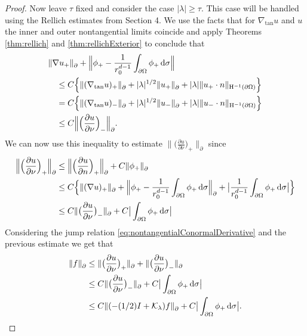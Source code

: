 \begin{proof}
  Now leave $\tau$ fixed and consider the case $|\lambda| \geq \tau$.
  This case will be handled using the Rellich estimates from Section 4.
  We use the facts that for $\nabla_{\mathrm{tan}} u$ and $u$ the inner and outer nontangential limits coincide and apply Theorems \ref{thm:rellich} and \ref{thm:rellichExterior} to conclude that
  \begin{align*}
    &\|\nabla u_+ \|^{}_\partial + \Big\| \phi_+ - \frac{1}{r_0^{d - 1}}\int_{\partial\Omega} \phi_+ \, {\operatorname{d}\!{\sigma}} \Big\| \\
    &\quad\leq C \Big\{ \|( \nabla_{\mathrm{tan}} u)_+ \|^{}_\partial + |\lambda|^{1/2} \|u_+\|^{}_\partial + |\lambda| \| u_+\cdot n\|_{\mathrm{H}^{-1}(\partial\Omega)} \Big\} \\
    &\quad = C \Big\{ \|( \nabla_{\mathrm{tan}} u)_- \|^{}_\partial + |\lambda|^{1/2} \|u_-\|^{}_\partial + |\lambda| \| u_-\cdot n\|_{\mathrm{H}^{-1}(\partial\Omega)} \Big\} \\
    &\quad\leq C \Big\| \Big(\frac{\partial u}{\partial \nu} \Big)_- \Big\|^{}_\partial.
  \end{align*}
  We can now use this inequality to estimate $\| \big( \frac{\partial u}{\partial \nu} \big)_+ \|_\partial^{}$ since
  \begin{align*}
    \Big\| \Big( \frac{\partial u}{\partial \nu} \Big)_+ \Big\|^{}_\partial
    &\leq \Big\|\Big(\frac{\partial u}{\partial n} \Big)_+ \Big\|^{}_\partial + C \| \phi_+ \|^{}_\partial \\
    &\leq C \Big\{  \| (\nabla u)_+ \|^{}_\partial + \Big\|\phi_+ - \frac{1}{r_0^{d - 1}} \int_{\partial\Omega} \phi_+ \, {\operatorname{d}\!{\sigma}} \Big\|^{}_\partial + \big| \frac{1}{r_0^{d -1}}\int_{\partial\Omega} \phi_+ \, {\operatorname{d}\!{\sigma}} \big| \Big\}\\
    &\leq C \| \big(\frac{\partial u}{\partial \nu} \big)_- \|^{}_\partial + C \big| \int_{\partial\Omega} \phi_+ \, {\operatorname{d}\!{\sigma}} \big|
  \end{align*}
  Considering the jump relation \eqref{eq:nontangentialConormalDerivative} and the previous estimate we get that
  \begin{align}
    \|f \|^{}_\partial 
    &\leq \|\big( \frac{\partial u}{\partial \nu} \big)_+ \|^{}_\partial + \| \big( \frac{\partial u}{\partial \nu} \big)_- \|^{}_\partial  \nonumber\\
    &\leq C \| \big( \frac{\partial u}{\partial \nu} \big)_- \|^{}_\partial + C \big| \int_{\partial\Omega} \phi_+ \d\sigma \big| \nonumber\\
    \label{eq:estimatef}
    &\leq C \| (-(1/2)I + \K_\lambda) f \|^{}_\partial + C \big| \int_{\partial\Omega} \phi_+ \d\sigma \big|.

\end{align}
\end{proof}
